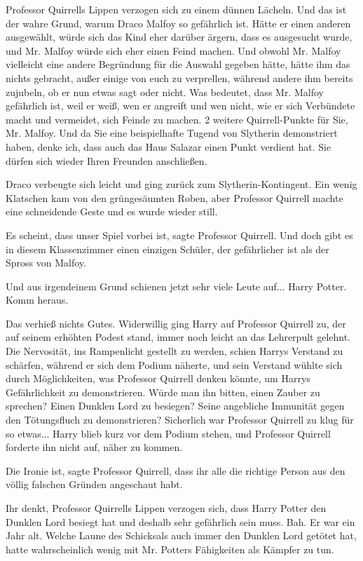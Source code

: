 Professor Quirrells Lippen verzogen sich zu einem dünnen Lächeln. \glqq{}Und das
ist der wahre Grund, warum Draco Malfoy so gefährlich ist. Hätte er einen
anderen ausgewählt, würde sich das Kind eher darüber ärgern, dass es ausgesucht
wurde, und Mr. Malfoy würde sich eher einen Feind machen. Und obwohl Mr. Malfoy
vielleicht eine andere Begründung für die Auswahl gegeben hätte, hätte ihm das
nichts gebracht, außer einige von euch zu verprellen, während andere ihm bereits
zujubeln, ob er nun etwas sagt oder nicht. Was bedeutet, dass Mr. Malfoy
gefährlich ist, weil er weiß, wen er angreift und wen nicht, wie er sich
Verbündete macht und vermeidet, sich Feinde zu machen. 2 weitere Quirrell-Punkte
für Sie, Mr. Malfoy. Und da Sie eine beispielhafte Tugend von Slytherin
demonstriert haben, denke ich, dass auch das Haus Salazar einen Punkt verdient
hat. Sie dürfen sich wieder Ihren Freunden anschließen.\grqq{}

Draco verbeugte sich leicht und ging zurück zum Slytherin-Kontingent. Ein wenig
Klatschen kam von den grüngesäumten Roben, aber Professor Quirrell machte eine
schneidende Geste und es wurde wieder still.

\glqq{}Es scheint, dass unser Spiel vorbei ist\grqq{}, sagte Professor Quirrell.
\glqq{}Und doch gibt es in diesem Klassenzimmer einen einzigen Schüler, der
gefährlicher ist als der Spross von Malfoy.\grqq{}

Und aus irgendeinem Grund schienen jetzt sehr viele Leute auf... \glqq{}Harry
Potter. Komm heraus.\grqq{}

Das verhieß nichts Gutes. Widerwillig ging Harry auf Professor Quirrell zu, der
auf seinem erhöhten Podest stand, immer noch leicht an das Lehrerpult gelehnt.
Die Nervosität, ins Rampenlicht gestellt zu werden, schien Harrys Verstand zu
schärfen, während er sich dem Podium näherte, und sein Verstand wühlte sich
durch Möglichkeiten, was Professor Quirrell denken könnte, um Harrys
Gefährlichkeit zu demonstrieren. Würde man ihn bitten, einen Zauber zu sprechen?
Einen Dunklen Lord zu besiegen? Seine angebliche Immunität gegen den
Tötungsfluch zu demonstrieren? Sicherlich war Professor Quirrell zu klug für so
etwas... Harry blieb kurz vor dem Podium stehen, und Professor Quirrell forderte
ihn nicht auf, näher zu kommen.

\glqq{}Die Ironie ist\grqq{}, sagte Professor Quirrell, \glqq{}dass ihr alle die
richtige Person aus den völlig falschen Gründen angeschaut habt.

Ihr denkt\grqq{}, Professor Quirrells Lippen verzogen sich, \glqq{}dass Harry
Potter den Dunklen Lord besiegt hat und deshalb sehr gefährlich sein muss. Bah.
Er war ein Jahr alt. Welche Laune des Schicksals auch immer den Dunklen Lord
getötet hat, hatte wahrscheinlich wenig mit Mr. Potters Fähigkeiten als Kämpfer
zu tun.

